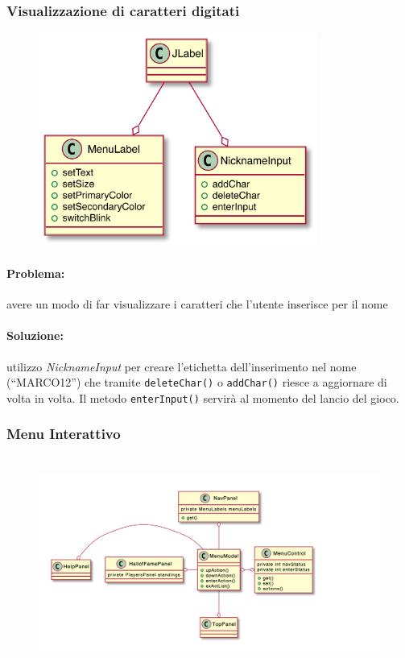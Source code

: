 \documentclass[a4paper,12pt]{report}
\begin{document}
\subsubsection{Visualizzazione di caratteri digitati}
    \begin{figure}[H]
    \centering
    \includegraphics[height=7cm]{img/ez/3.png}
\end{figure}
\paragraph{Problema:} avere un modo di far visualizzare i caratteri che l’utente inserisce per il nome

\paragraph{Soluzione:} utilizzo \emph{NicknameInput} per creare l’etichetta dell’inserimento nel nome (“MARCO12”) che tramite \texttt{deleteChar()} o \texttt{addChar()} riesce a aggiornare di volta in volta.
Il metodo \texttt{enterInput()} servirà al momento del lancio del gioco. 

\subsubsection{Menu Interattivo}
    \begin{figure}[H]
    \centering
    \includegraphics[height=7cm]{img/ez/5.png}
\end{figure}
\end{document}
